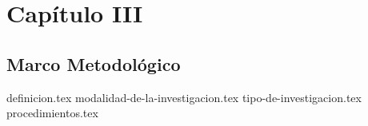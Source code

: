 \chapter{Capítulo III}
\section{Marco Metodológico}
{definicion.tex}
{modalidad-de-la-investigacion.tex}
{tipo-de-investigacion.tex}
{procedimientos.tex}
